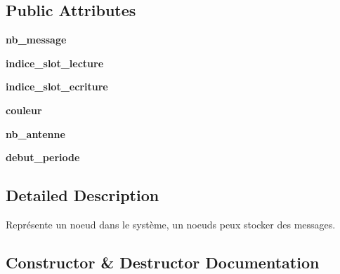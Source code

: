 \subsection*{Public Attributes}
\begin{DoxyCompactItemize}
\item 
{\bfseries nb\+\_\+message}\hypertarget{classsimulation__v2_1_1Noeud_a9a594e42a40d532c739332558f80cee5}{}\label{classsimulation__v2_1_1Noeud_a9a594e42a40d532c739332558f80cee5}

\item 
{\bfseries indice\+\_\+slot\+\_\+lecture}\hypertarget{classsimulation__v2_1_1Noeud_a52077731fed276c8f910ea514e87e213}{}\label{classsimulation__v2_1_1Noeud_a52077731fed276c8f910ea514e87e213}

\item 
{\bfseries indice\+\_\+slot\+\_\+ecriture}\hypertarget{classsimulation__v2_1_1Noeud_a9ef4c00f4ae5b55bad721fe3352ff1c0}{}\label{classsimulation__v2_1_1Noeud_a9ef4c00f4ae5b55bad721fe3352ff1c0}

\item 
{\bfseries couleur}\hypertarget{classsimulation__v2_1_1Noeud_a7e2b345a39d2c1c6ed51324782a54261}{}\label{classsimulation__v2_1_1Noeud_a7e2b345a39d2c1c6ed51324782a54261}

\item 
{\bfseries nb\+\_\+antenne}\hypertarget{classsimulation__v2_1_1Noeud_a9e76e7d9af5a9d54968a3ff6f97927c4}{}\label{classsimulation__v2_1_1Noeud_a9e76e7d9af5a9d54968a3ff6f97927c4}

\item 
{\bfseries debut\+\_\+periode}\hypertarget{classsimulation__v2_1_1Noeud_a83fe70fbc2874cc203a567f35849e3e8}{}\label{classsimulation__v2_1_1Noeud_a83fe70fbc2874cc203a567f35849e3e8}

\end{DoxyCompactItemize}


\subsection{Detailed Description}
\begin{DoxyVerb}    Représente un noeud dans le système, un noeuds peux stocker des messages.
\end{DoxyVerb}
 

\subsection{Constructor \& Destructor Documentation}
